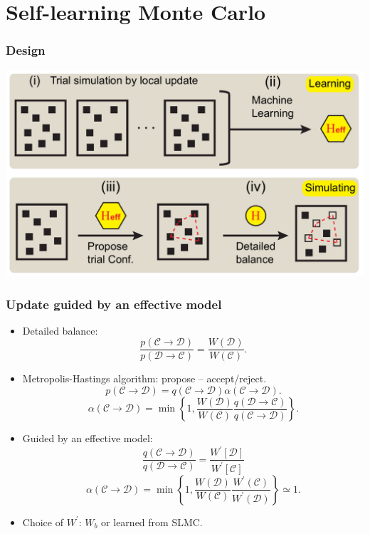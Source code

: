 \documentclass[xcolor=table, 10pt, aspectratio=43]{beamer}
\begin{document}
\section{Self-learning Monte Carlo}

\begin{frame}
  \frametitle{Design}
  \begin{center}
    \includegraphics[width=\textwidth]{../eqmc/slmc-design}
  \end{center}
\end{frame}

\begin{frame}
  \frametitle{Update guided by an effective model}
  \begin{itemize}
    \item Detailed balance:
    \[\frac{p(\mathcal C\rightarrow\mathcal D)}{p(\mathcal D\rightarrow\mathcal C)}=\frac{W(\mathcal D)}{W(\mathcal C)}.\]
    \item Metropolis-Hastings algorithm: propose -- accept/reject.
    \[p(\mathcal C\rightarrow\mathcal D) = q(\mathcal C\rightarrow\mathcal D)
    \alpha(\mathcal C\rightarrow\mathcal D).\]
    \[\alpha(\mathcal C\rightarrow\mathcal D) =
    \min\left\{1, \frac{W(\mathcal D)}{W(\mathcal C)}
    \frac{q(\mathcal D\rightarrow\mathcal C)}
    {q(\mathcal C\rightarrow\mathcal D)}\right\}.\]
    \item Guided by an effective model:
    \[\frac{q(\mathcal C\rightarrow\mathcal D)}
    {q(\mathcal D\rightarrow\mathcal C)}
    =\frac{W^\prime[\mathcal D]}{W^\prime[\mathcal C]}\]
    \[\alpha(\mathcal C\rightarrow \mathcal D)=\min\left\{1, \frac{W(\mathcal D)}{W(\mathcal C)}
    \frac{W^\prime(\mathcal C)}{W^\prime(\mathcal D)}\right\}\simeq1.\]
    \item Choice of $W^\prime$: $W_b$ or learned from SLMC.
  \end{itemize}
\end{frame}
\end{document}
